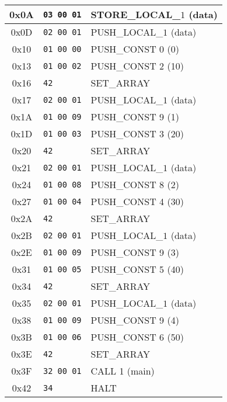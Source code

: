 \documentclass[a4paper,12pt]{article}
\begin{document}
\begin{longtable}{|c|l|p{6cm}|}
    0x0A & \texttt{03 00 01} & STORE\_LOCAL\_$1$ (data) \\ \hline
    0x0D & \texttt{02 00 01} & PUSH\_LOCAL\_$1$ (data) \\ \hline
    0x10 & \texttt{01 00 00} & PUSH\_CONST 0 (0) \\ \hline
    0x13 & \texttt{01 00 02} & PUSH\_CONST 2 (10) \\ \hline
    0x16 & \texttt{42} & SET\_ARRAY \\ \hline
    0x17 & \texttt{02 00 01} & PUSH\_LOCAL\_$1$ (data) \\ \hline
    0x1A & \texttt{01 00 09} & PUSH\_CONST 9 (1) \\ \hline
    0x1D & \texttt{01 00 03} & PUSH\_CONST 3 (20) \\ \hline
    0x20 & \texttt{42} & SET\_ARRAY \\ \hline
    0x21 & \texttt{02 00 01} & PUSH\_LOCAL\_$1$ (data) \\ \hline
    0x24 & \texttt{01 00 08} & PUSH\_CONST 8 (2) \\ \hline
    0x27 & \texttt{01 00 04} & PUSH\_CONST 4 (30) \\ \hline
    0x2A & \texttt{42} & SET\_ARRAY \\ \hline
    0x2B & \texttt{02 00 01} & PUSH\_LOCAL\_$1$ (data) \\ \hline
    0x2E & \texttt{01 00 09} & PUSH\_CONST 9 (3) \\ \hline
    0x31 & \texttt{01 00 05} & PUSH\_CONST 5 (40) \\ \hline
    0x34 & \texttt{42} & SET\_ARRAY \\ \hline
    0x35 & \texttt{02 00 01} & PUSH\_LOCAL\_$1$ (data) \\ \hline
    0x38 & \texttt{01 00 09} & PUSH\_CONST 9 (4) \\ \hline
    0x3B & \texttt{01 00 06} & PUSH\_CONST 6 (50) \\ \hline
    0x3E & \texttt{42} & SET\_ARRAY \\ \hline
    0x3F & \texttt{32 00 01} & CALL 1 (main) \\ \hline
    0x42 & \texttt{34} & HALT \\ \hline
    \end{longtable}
\end{document}
